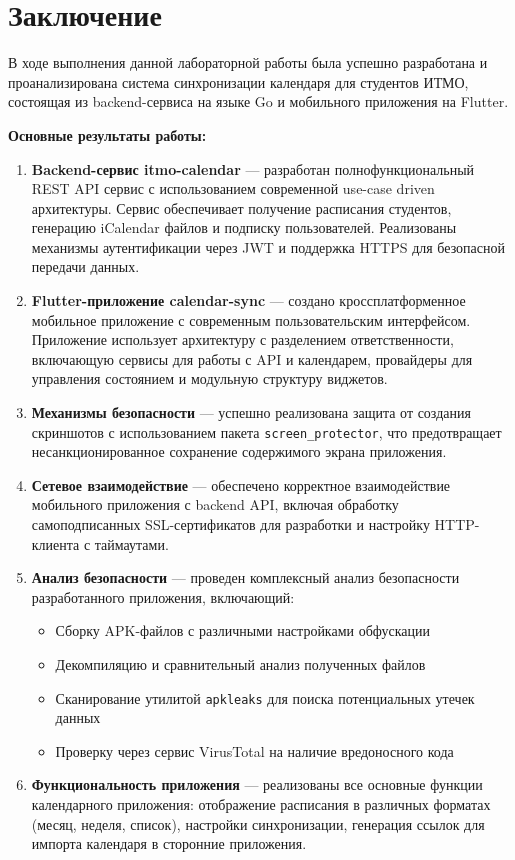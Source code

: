 \chapter*{Заключение}

В ходе выполнения данной лабораторной работы была успешно разработана и проанализирована система синхронизации календаря для студентов ИТМО, состоящая из backend-сервиса на языке Go и мобильного приложения на Flutter.

\textbf{Основные результаты работы:}

\begin{enumerate}
    \item \textbf{Backend-сервис itmo-calendar} --- разработан полнофункциональный REST API сервис с использованием современной use-case driven архитектуры. Сервис обеспечивает получение расписания студентов, генерацию iCalendar файлов и подписку пользователей. Реализованы механизмы аутентификации через JWT и поддержка HTTPS для безопасной передачи данных.
    
    \item \textbf{Flutter-приложение calendar-sync} --- создано кроссплатформенное мобильное приложение с современным пользовательским интерфейсом. Приложение использует архитектуру с разделением ответственности, включающую сервисы для работы с API и календарем, провайдеры для управления состоянием и модульную структуру виджетов.
    
    \item \textbf{Механизмы безопасности} --- успешно реализована защита от создания скриншотов с использованием пакета \texttt{screen\_protector}, что предотвращает несанкционированное сохранение содержимого экрана приложения.
    
    \item \textbf{Сетевое взаимодействие} --- обеспечено корректное взаимодействие мобильного приложения с backend API, включая обработку самоподписанных SSL-сертификатов для разработки и настройку HTTP-клиента с таймаутами.
    
    \item \textbf{Анализ безопасности} --- проведен комплексный анализ безопасности разработанного приложения, включающий:
    \begin{itemize}
        \item Сборку APK-файлов с различными настройками обфускации
        \item Декомпиляцию и сравнительный анализ полученных файлов
        \item Сканирование утилитой \texttt{apkleaks} для поиска потенциальных утечек данных
        \item Проверку через сервис VirusTotal на наличие вредоносного кода
    \end{itemize}
    
    \item \textbf{Функциональность приложения} --- реализованы все основные функции календарного приложения: отображение расписания в различных форматах (месяц, неделя, список), настройки синхронизации, генерация ссылок для импорта календаря в сторонние приложения.
\end{enumerate}

